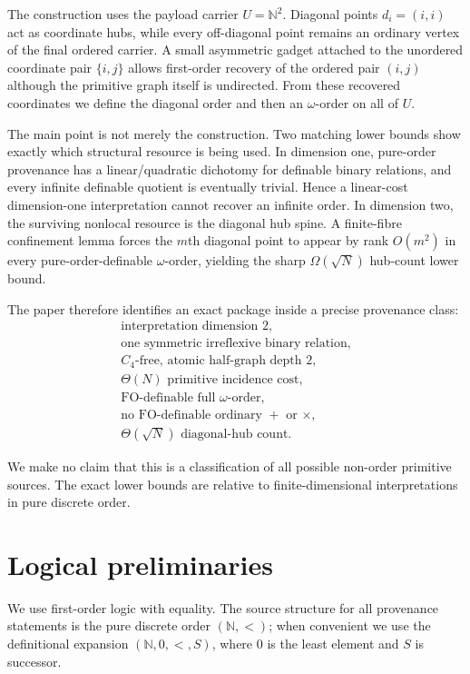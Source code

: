 \documentclass[11pt]{article}
\theoremstyle{definition}
\newcommand{\N}{\mathbb N}
\newcommand{\FO}{\mathrm{FO}}
\begin{document}
The construction uses the payload carrier $U=\N^2$.  Diagonal points $d_i=(i,i)$ act as coordinate hubs, while every off-diagonal point remains an ordinary vertex of the final ordered carrier.  A small asymmetric gadget attached to the unordered coordinate pair $\{i,j\}$ allows first-order recovery of the ordered pair $(i,j)$ although the primitive graph itself is undirected.  From these recovered coordinates we define the diagonal order and then an $\omega$-order on all of $U$.

The main point is not merely the construction.  Two matching lower bounds show exactly which structural resource is being used.  In dimension one, pure-order provenance has a linear/quadratic dichotomy for definable binary relations, and every infinite definable quotient is eventually trivial.  Hence a linear-cost dimension-one interpretation cannot recover an infinite order.  In dimension two, the surviving nonlocal resource is the diagonal hub spine.  A finite-fibre confinement lemma forces the $m$th diagonal point to appear by rank $O(m^2)$ in every pure-order-definable $\omega$-order, yielding the sharp $\Omega(\sqrt N)$ hub-count lower bound.

The paper therefore identifies an exact package inside a precise provenance class:
\[
\boxed{
\begin{array}{c}
\text{interpretation dimension }2,\\
\text{one symmetric irreflexive binary relation},\\
C_4\text{-free, atomic half-graph depth }2,\\
\Theta(N)\text{ primitive incidence cost},\\
\FO\text{-definable full }\omega\text{-order},\\
\text{no }\FO\text{-definable ordinary }+\text{ or }\times,\\
\Theta(\sqrt N)\text{ diagonal-hub count.}
\end{array}}
\]

We make no claim that this is a classification of all possible non-order primitive sources.  The exact lower bounds are relative to finite-dimensional interpretations in pure discrete order.

\section{Logical preliminaries}

We use first-order logic with equality.  The source structure for all provenance statements is the pure discrete order $(\N,<)$; when convenient we use the definitional expansion $(\N,0,<,S)$, where $0$ is the least element and $S$ is successor.
\end{document}
